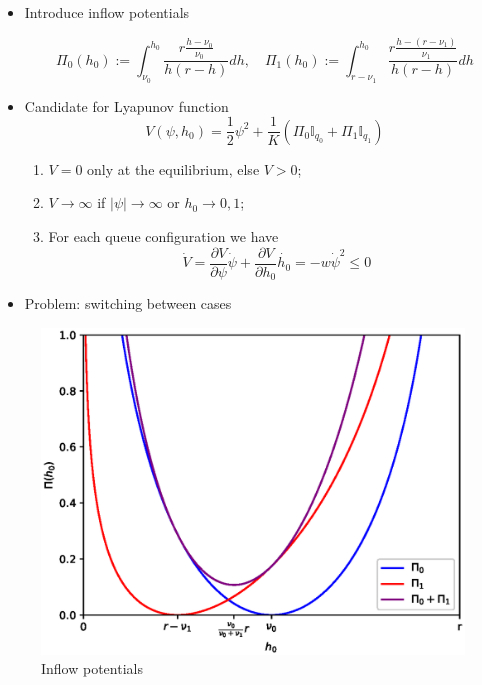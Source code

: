 \documentclass[10pt]{beamer}
\begin{document}
\begin{frame}

\begin{itemize}

 

\item Introduce inflow potentials

$$ \Pi_0(h_0) := \int_{\nu_0}^{h_0} \frac{ r \frac{h - \nu_0}{\nu_0} }{h(r-h)} dh, \quad \Pi_1(h_0) := \int_{ r-\nu_1}^{h_0}  \frac{ r \frac{h - (r - \nu_1)}{\nu_1} }{h(r-h)} dh $$

\item Candidate for Lyapunov function 
$$ V(\psi, h_0) = \frac{1}{2}\psi^2 + \frac{1}{K} \left( \Pi_0 \mathbb{I}_{q_0} + \Pi_1 \mathbb{I}_{q_1} \right) $$

\begin{enumerate}

\item $V = 0$ only at the equilibrium, else $V > 0$;

\item $V \to \infty$ if $|\psi| \to \infty$ or $h_0 \to 0,1$;

\item For each queue configuration we have
$$ \dot{V} = \frac{\partial V}{\partial \psi} \dot{\psi} + \frac{\partial V}{\partial h_0} \dot{h_0}  = -w \dot{\psi}^2 \leq 0$$

\end{enumerate}


\item Problem: switching between cases

\end{itemize}

\end{frame}

\begin{frame}


	
	\begin{center}
		\begin{figure}
			\includegraphics[scale=0.6]{img/potentials.eps}
			\caption{Inflow potentials}	
		\end{figure}	  
	\end{center}  

 
\end{frame}
\end{document}
